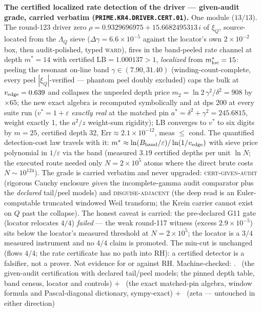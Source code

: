 \documentclass[11pt,a4paper]{article}
\theoremstyle{definition}
\begin{document}
\par\smallskip\noindent\textbf{The certified localized rate
detection of the driver --- given-audit grade, carried verbatim
(\texttt{PRIME.KR4.\allowbreak DRIVER.\allowbreak CERT.01}).}
One module ($13/13$).  The round-123 driver zero
$\rho = 0.9329696975 + 15.6682495313\,i$ of $\xi_Q$,
source-located from the $\Lambda_Q$ sieve
($\Delta\gamma = 6.6\times10^{-5}$ against the locator's own
$2\times10^{-2}$ box, then audit-polished, typed \textsc{ward}),
fires in the band-peeled rate channel at depth $m^* = 14$ with
certified $\mathrm{LB} = 1.000137 > 1$, \emph{localized} from
$m^*_{\rm loc} = 15$: peeling the resonant on-line band
$\gamma \in (7.90, 31.40)$ (winding-count-complete, every peel
$|\xi_Q|$-verified --- phantom peel doubly excluded) caps the
bulk at $v_{\rm edge} = 0.639$ and collapses the unpeeled depth
price $m_2 = \ln 2\,\gamma^2/\delta^2 = 908$ by $\times 65$; the
new exact algebra is recomputed symbolically and at dps 200 at
every suite run ($v^* = 1 + \varepsilon$ \emph{exactly real} at
the matched pin $a^* = \delta^2 + \gamma^2 = 245.6815$, weight
exactly 1, the $a^2/z$ weight-sum rigidity); LB converges to
$v^*$ to six digits by $m = 25$, certified depth 32,
$\mathrm{Err} \approx 2.1\times10^{-12}$, meas $\le$ cond.  The
quantified detection-cost law travels with it:
$m^* \approx \ln(B_{\rm band}/\varepsilon)/\ln(1/v_{\rm edge})$
with sieve price polynomial in $1/\varepsilon$ via the band
(measured $3.19$ certified depths per unit $\ln N$; the executed
route needed only $N = 2\times10^5$ atoms where the direct brute
costs $N \sim 10^{124}$).  The grade is carried verbatim and
never upgraded: \textsc{cert-given-audit} (rigorous Cauchy
enclosure \emph{given} the incomplete-gamma audit comparator plus
the \emph{declared} tail/peel models) and
\textsc{disguise-adjacent} (the deep read is an Euler-computable
truncated windowed Weil transform; the Krein carrier cannot exist
on $Q$ past the collapse).  The honest caveat is carried: the
pre-declared G11 gate (locator relocates $4/4$) \emph{failed} ---
the weak round-117 witness (excess $2.9\times10^{-5}$) sits below
the locator's measured threshold at $N = 2\times10^5$; the
locator is a $3/4$ measured instrument and no $4/4$ claim is
promoted.  The min-cut is unchanged (flows $4/4$; the rate
certificate has no path into RH): a certified detector is a
falsifier, not a prover.  Not evidence for or against RH.
Machine-checked: .
\mC\ (the given-audit certification with declared tail/peel
models; the pinned depth table, band census, locator and
controls) $+$ \mE\ (the exact matched-pin algebra, window
formula and Pascal-diagonal dictionary, sympy-exact) $+$ \mO\
(zeta --- untouched in either direction)
\par\smallskip
\end{document}
